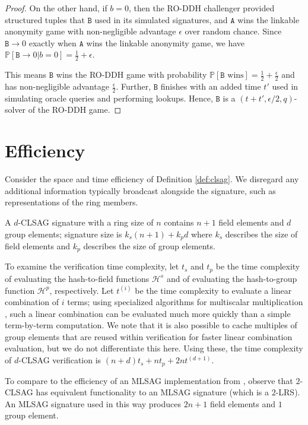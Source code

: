 \documentclass{llncs}
\newcommand{\A}{\texttt{A}}
\newcommand{\B}{\texttt{B}}
\newcommand{\Hp}{\mathcal{H}^p}
\newcommand{\Hs}{\mathcal{H}^s}
\newcommand{\prob}{\mathbb{P}}
\begin{document}
\begin{proof}
On the other hand, if $b = 0$, then the RO-DDH challenger provided structured tuples that $\B$ used in its simulated signatures, and $\A$ wins the linkable anonymity game with non-negligible advantage $\epsilon$ over random chance. Since $\B \to 0$ exactly when $\A$ wins the linkable anonymity game, we have $\prob[\B \to 0 | b = 0] = \frac{1}{2} + \epsilon$.

This means $\B$ wins the RO-DDH game with probability $\prob[\B \text{ wins}] = \frac{1}{2} + \frac{\epsilon}{2}$ and has non-negligible advantage $\frac{\epsilon}{2}$. Further, $\B$ finishes with an added time $t'$ used in simulating oracle queries and performing lookups. Hence, $\B$ is a $(t+t',\epsilon/2,q)$-solver of the RO-DDH game.
\end{proof}


\section{Efficiency}\label{sec:efficiency}
Consider the space and time efficiency of Definition \ref{def:clsag}. We disregard any additional information typically broadcast alongside the signature, such as representations of the ring members.

A $d$-CLSAG signature with a ring size of $n$ contains $n+1$ field elements and $d$ group elements; signature size is $k_s(n+1) + k_p d$ where $k_s$ describes the size of field elements and $k_p$ describes the size of group elements.

To examine the verification time complexity, let $t_s$ and $t_p$ be the time complexity of evaluating the hash-to-field functions $\Hs$ and of evaluating the hash-to-group function $\Hp$, respectively. Let $t^{(i)}$ be the time complexity to evaluate a linear combination of $i$ terms; using specialized algorithms for multiscalar multiplication \cite{straus1964addition,pippenger1980evaluation}, such a linear combination can be evaluated much more quickly than a simple term-by-term computation. We note that it is also possible to cache multiples of group elements that are reused within verification for faster linear combination evaluation, but we do not differentiate this here. Using these, the time complexity of $d$-CLSAG verification is $(n+d)t_s + nt_p + 2nt^{(d+1)}$.

To compare to the efficiency of an MLSAG implementation from \cite{noether2016ring}, observe that $2$-CLSAG has equivalent functionality to an MLSAG signature (which is a $2$-LRS). An MLSAG signature used in this way produces $2n+1$ field elements and $1$ group element.
\end{document}
